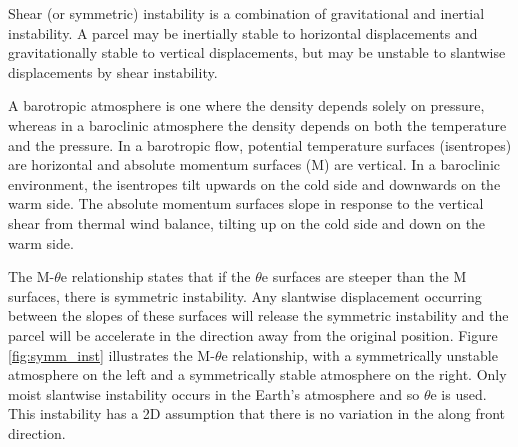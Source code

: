 Shear (or symmetric) instability is a combination of gravitational and inertial instability. A parcel may be inertially stable to horizontal displacements and gravitationally stable to vertical displacements, but may be unstable to slantwise displacements by shear instability. 

A barotropic atmosphere is one where the density depends solely on pressure, whereas in a baroclinic atmosphere the density depends on both the temperature and the pressure. In a barotropic flow, potential temperature surfaces (isentropes) are horizontal and absolute momentum surfaces (M) are vertical. In a baroclinic environment, the isentropes tilt upwards on the cold side and downwards on the warm side. The absolute momentum surfaces slope in response to the vertical shear from thermal wind balance, tilting up on the cold side and down on the warm side.
%

The  M-$\theta$e relationship states that if the $\theta$e surfaces are steeper than the M surfaces, there is symmetric instability. Any slantwise displacement occurring between the slopes of these surfaces will release the symmetric instability and the parcel will be accelerate in the direction away from the original position. Figure \ref{fig:symm_inst} illustrates the M-$\theta$e relationship, with a symmetrically unstable atmosphere on the left and a symmetrically stable atmosphere on the right. Only moist slantwise instability occurs in the Earth's atmosphere \cite{bennetts1979conditional} and so $\theta$e is used. This instability has a 2D assumption that there is no variation in the along front direction. 


